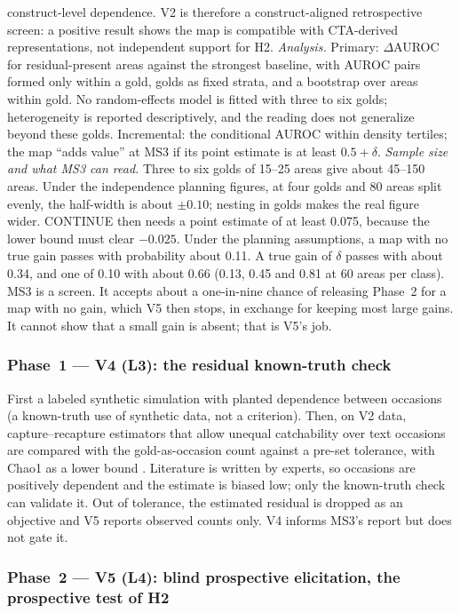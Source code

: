 construct-level dependence. V2 is therefore a construct-aligned retrospective screen: a positive result
shows the map is compatible with CTA-derived representations, not independent support for H2.
\emph{Analysis.} Primary: $\Delta$AUROC for residual-present areas against the strongest baseline, with
AUROC pairs formed only within a gold, golds as fixed strata, and a bootstrap over areas within gold.
No random-effects model is fitted with three to six golds; heterogeneity is reported descriptively,
and the reading does not generalize beyond these golds. Incremental: the conditional AUROC within density tertiles; the map \enquote{adds value}
at MS3 if its point estimate is at least $0.5 + \delta$.
\emph{Sample size and what MS3 can read.} Three to six golds of 15--25 areas give about 45--150
areas. Under the independence planning figures, at four golds and 80 areas split evenly, the
half-width is about $\pm 0.10$; nesting in golds makes the real figure wider. CONTINUE then needs a point estimate of at least 0.075, because the
lower bound must clear $-0.025$. Under the planning assumptions, a map with no true gain passes
with probability about 0.11. A true gain of $\delta$ passes with about 0.34, and one of 0.10 with
about 0.66 (0.13, 0.45 and 0.81 at 60 areas per class). \evint{} MS3 is a screen. It accepts
about a one-in-nine chance of releasing Phase~2 for a map with no gain, which V5 then stops, in
exchange for keeping most large gains. It cannot show that a small gain is absent; that is V5's
job.

\subsubsection{Phase~1 --- V4 (L3): the residual known-truth check}

First a labeled synthetic simulation with planted dependence between occasions (a known-truth use
of synthetic data, not a criterion). Then, on V2 data, capture--recapture estimators that allow
unequal catchability over text occasions are compared with the gold-as-occasion count against a
pre-set tolerance, with Chao1 as a lower bound \parencite{chao1987estimating,briand2000comprehensive}. \evint{} Literature is written by experts, so
occasions are positively dependent and the estimate is biased low; only the known-truth check can
validate it. Out of tolerance, the estimated residual is dropped as an objective and V5 reports
observed counts only. V4 informs MS3's report but does not gate it.

\subsubsection{Phase~2 --- V5 (L4): blind prospective elicitation, the prospective test of H2}

